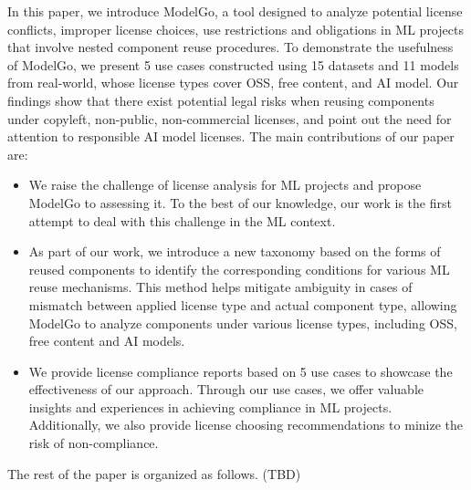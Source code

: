 In this paper, we introduce ModelGo, a tool designed to analyze potential license conflicts, improper license choices, use restrictions and obligations in ML projects that involve nested component reuse procedures.
To demonstrate the usefulness of ModelGo, we present 5 use cases constructed using 15 datasets and 11 models from real-world, whose license types cover OSS, free content, and AI model.
Our findings show that there exist potential legal risks when reusing  components under copyleft, non-public, non-commercial licenses, and point out the need for attention to responsible AI model licenses.
The main contributions of our paper are:
\begin{itemize}
    \item We raise the challenge of license analysis for ML projects and propose ModelGo to assessing it. To the best of our knowledge, our work is the first attempt to deal with this challenge in the ML context.
    \item As part of our work, we introduce a new taxonomy based on the forms of reused components to identify the corresponding conditions for various ML reuse mechanisms. This method helps mitigate ambiguity in cases of mismatch between applied license type and actual component type, allowing ModelGo to analyze components under various license types, including OSS, free content and AI models.
    \item  We provide license compliance reports based on 5 use cases to showcase the effectiveness of our approach. 
    Through our use cases, we offer valuable insights and experiences in achieving compliance in ML projects. 
    Additionally, we also provide license choosing recommendations to minize the risk of non-compliance.
\end{itemize}

The rest of the paper is organized as follows. (TBD)

